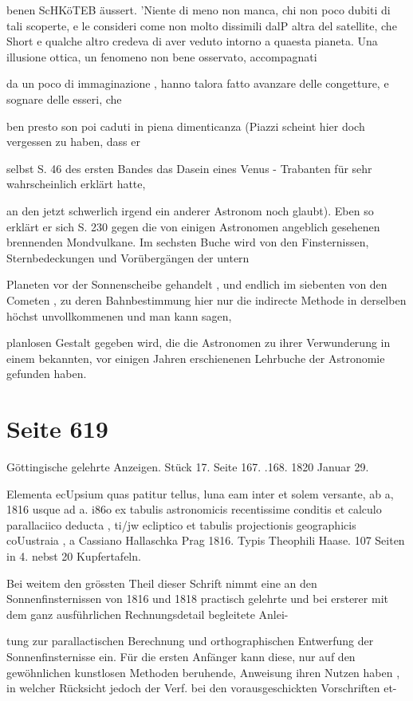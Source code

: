 \documentclass[10pt,a4paper]{article}
\begin{document}
benen ScHKöTEB äussert. 'Niente di meno non manca, chi non poco dubiti di tali scoperte, e le consideri come non molto dissimili dalP altra del satellite, che Short e qualche altro credeva di aver veduto intorno a quaesta pianeta. Una illusione ottica, un fenomeno non bene osservato, accompagnati

da un poco di immaginazione , hanno talora fatto avanzare delle congetture, e sognare delle esseri, che

ben presto son poi caduti in piena dimenticanza (Piazzi scheint hier doch vergessen zu haben, dass er

selbst S. 46 des ersten Bandes das Dasein eines Venus - Trabanten für sehr wahrscheinlich erklärt hatte,

an den jetzt schwerlich irgend ein anderer Astronom noch glaubt). Eben so erklärt er sich S. 230 gegen die von einigen Astronomen angeblich gesehenen brennenden Mondvulkane. Im sechsten Buche wird von den Finsternissen, Sternbedeckungen und Vorübergängen der untern

Planeten vor der Sonnenscheibe gehandelt , und endlich im siebenten von den Cometen , zu deren Bahnbestimmung hier nur die indirecte Methode in derselben höchst unvollkommenen und man kann sagen,

planlosen Gestalt gegeben wird, die die Astronomen zu ihrer Verwunderung in einem bekannten, vor einigen Jahren erschienenen Lehrbuche der Astronomie gefunden haben.


\newpage
\section*{Seite 619}
Göttingische gelehrte Anzeigen. Stück 17. Seite 167. .168. 1820 Januar 29.

Elementa ecUpsium quas patitur tellus, luna eam inter et solem versante, ab a, 1816 usque ad a. i86o ex tabulis astronomicis recentissime conditis et calculo parallaciico deducta , ti/jw ecliptico et tabulis projectionis geographicis coUustraia , a Cassiano Hallaschka Prag 1816. Typis Theophili Haase. 107 Seiten in 4. nebst 20 Kupfertafeln.

Bei weitem den grössten Theil dieser Schrift nimmt eine an den Sonnenfinsternissen von 1816 und 1818 practisch gelehrte und bei ersterer mit dem ganz ausführlichen Rechnungsdetail begleitete Anlei-

tung zur parallactischen Berechnung und orthographischen Entwerfung der Sonnenfinsternisse ein. Für die ersten Anfänger kann diese, nur auf den gewöhnlichen kunstlosen Methoden beruhende, Anweisung ihren Nutzen haben , in welcher Rücksicht jedoch der Verf. bei den vorausgeschickten Vorschriften et-
\end{document}
